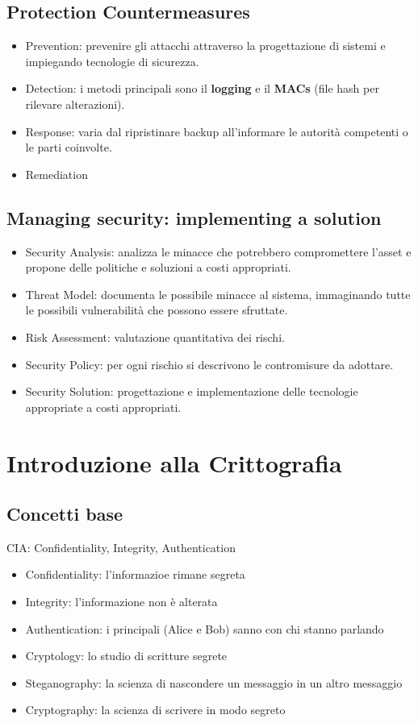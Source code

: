\documentclass[12pt, a4paper]{report}
\begin{document}
\section{Protection Countermeasures}
\begin{itemize}
    \item Prevention: prevenire gli attacchi attraverso la progettazione di sistemi e impiegando tecnologie di sicurezza.
    \item Detection: i metodi principali sono il \textbf{logging} e il \textbf{MACs} (file hash per rilevare alterazioni).
    \item Response: varia dal ripristinare backup all'informare le autorità competenti o le parti coinvolte.
    \item Remediation
\end{itemize}
\section{Managing security: implementing a solution}
\begin{itemize}
    \item Security Analysis: analizza le minacce che potrebbero compromettere l'asset e propone delle politiche e soluzioni a costi appropriati.
    \item Threat Model: documenta le possibile minacce al sistema, immaginando tutte le possibili vulnerabilità che possono essere sfruttate.
    \item Risk Assessment: valutazione quantitativa dei rischi.
    \item Security Policy: per ogni rischio si descrivono le contromisure da adottare.
    \item Security Solution: progettazione e implementazione delle tecnologie appropriate a costi appropriati.
\end{itemize}
\chapter{Introduzione alla Crittografia}
\section{Concetti base}
CIA: Confidentiality, Integrity, Authentication
\begin{itemize}
    \item Confidentiality: l'informazioe rimane segreta
    \item Integrity: l'informazione non è alterata
    \item Authentication: i principali (Alice e Bob) sanno con chi stanno parlando  
\end{itemize}
\begin{itemize}
    \item Cryptology: lo studio di scritture segrete
    \item Steganography: la scienza di nascondere un messaggio in un altro messaggio
    \item Cryptography: la scienza di scrivere in modo segreto
\end{itemize}
\end{document}
